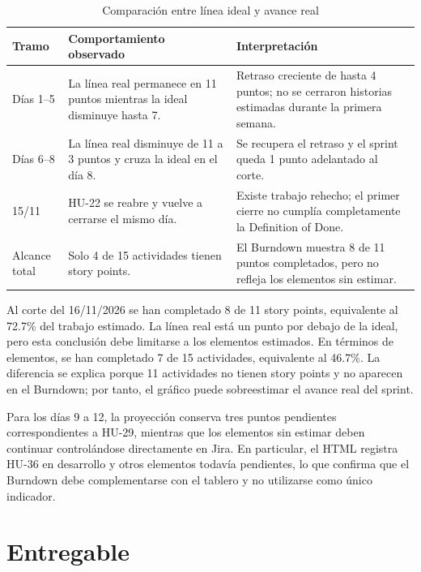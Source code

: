 \documentclass[12pt,a4paper]{article}
\begin{document}
\begin{table}[h]
\centering
\caption{Comparación entre línea ideal y avance real}
\label{tab:analisisSprint3}
\begin{tabular}{p{3.4cm}p{5cm}p{5cm}}
\toprule
\textbf{Tramo} & \textbf{Comportamiento observado} & \textbf{Interpretación}\\
\midrule
Días 1--5 & La línea real permanece en 11 puntos mientras la ideal disminuye
hasta 7. & Retraso creciente de hasta 4 puntos; no se cerraron historias
estimadas durante la primera semana.\\
Días 6--8 & La línea real disminuye de 11 a 3 puntos y cruza la ideal en el
día 8. & Se recupera el retraso y el sprint queda 1 punto adelantado al corte.\\
15/11 & HU-22 se reabre y vuelve a cerrarse el mismo día. & Existe trabajo
rehecho; el primer cierre no cumplía completamente la Definition of Done.\\
Alcance total & Solo 4 de 15 actividades tienen story points. & El Burndown
muestra 8 de 11 puntos completados, pero no refleja los elementos sin estimar.\\
\bottomrule
\end{tabular}
\end{table}

Al corte del 16/11/2026 se han completado 8 de 11 story points, equivalente al
72.7\% del trabajo estimado. La línea real está un punto por debajo de la
ideal, pero esta conclusión debe limitarse a los elementos estimados. En
términos de elementos, se han completado 7 de 15 actividades, equivalente al
46.7\%. La diferencia se explica porque 11 actividades no tienen story points y
no aparecen en el Burndown; por tanto, el gráfico puede sobreestimar el avance
real del sprint.

Para los días 9 a 12, la proyección conserva tres puntos pendientes
correspondientes a HU-29, mientras que los elementos sin estimar deben
continuar controlándose directamente en Jira. En particular, el HTML registra
HU-36 en desarrollo y otros elementos todavía pendientes, lo que confirma que
el Burndown debe complementarse con el tablero y no utilizarse como único
indicador.

\section{Entregable}
\end{document}
